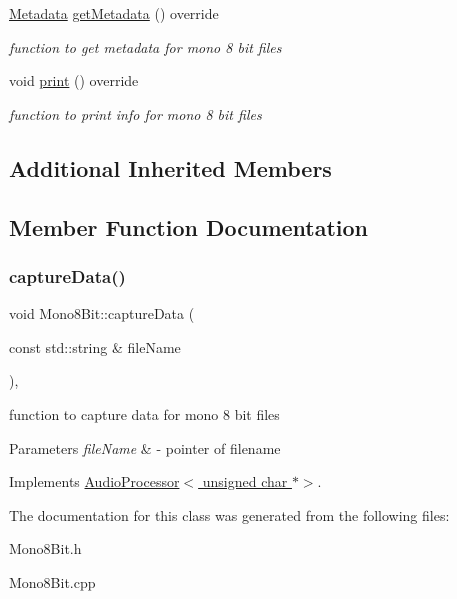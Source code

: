 \begin{DoxyCompactItemize}
\mbox{\label{classMono8Bit_a1a75a41b156dcc1154aca234d4ee8c79}} 
\hyperlink{structMetadata}{Metadata} \hyperlink{classMono8Bit_a1a75a41b156dcc1154aca234d4ee8c79}{get\+Metadata} () override
\begin{DoxyCompactList}\small\item\em function to get metadata for mono 8 bit files \end{DoxyCompactList}\item 
\mbox{\label{classMono8Bit_a220be8c85489785cf5212aaf62a4ee57}} 
void \hyperlink{classMono8Bit_a220be8c85489785cf5212aaf62a4ee57}{print} () override
\begin{DoxyCompactList}\small\item\em function to print info for mono 8 bit files \end{DoxyCompactList}\end{DoxyCompactItemize}
\subsection*{Additional Inherited Members}


\subsection{Member Function Documentation}
\mbox{\label{classMono8Bit_a87631b77782bb49ae04b24560d6bcc1f}} 
\subsubsection{\texorpdfstring{capture\+Data()}{captureData()}}
{\footnotesize\ttfamily void Mono8\+Bit\+::capture\+Data (\begin{DoxyParamCaption}\item[{const std\+::string \&}]{file\+Name }\end{DoxyParamCaption})\hspace{0.3cm}{\ttfamily [override]}, {\ttfamily [virtual]}}



function to capture data for mono 8 bit files 


\begin{DoxyParams}{Parameters}
{\em file\+Name} & -\/ pointer of filename \\
\hline
\end{DoxyParams}


Implements \hyperlink{classAudioProcessor_a0d6d6ef552e671405150d2cfbd4095c5}{Audio\+Processor$<$ unsigned char $\ast$$>$}.



The documentation for this class was generated from the following files\+:\begin{DoxyCompactItemize}
\item 
Mono8\+Bit.\+h\item 
Mono8\+Bit.\+cpp\end{DoxyCompactItemize}
